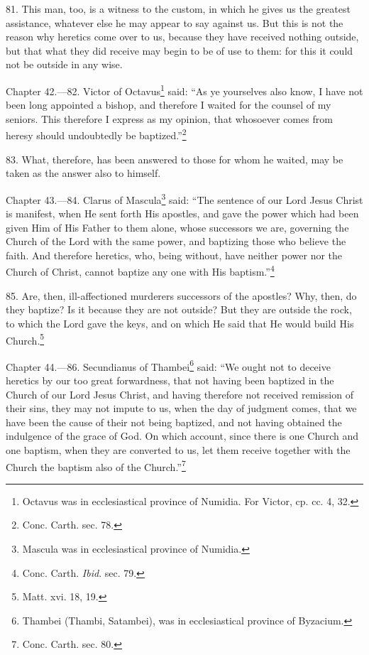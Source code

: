 81. This man, too, is a witness to the custom, in which he gives us the greatest assistance, whatever else he may appear to say against us. But this is not the reason why heretics come over to us, because they have received nothing outside, but that what they did receive may begin to be of use to them: for this it could not be outside in any wise.


Chapter 42.—82. Victor of Octavus\footnote{\par  Octavus was in ecclesiastical province of Numidia. For Victor, cp. cc. 4, 32.} said: ``As ye yourselves also know, I have not been long appointed a bishop, and therefore I waited for the counsel of my seniors. This therefore I express as my opinion, that whosoever comes from heresy should undoubtedly be baptized.''\footnote{\par  Conc. Carth. sec. 78.}

83. What, therefore, has been answered to those for whom he waited, may be taken as the answer also to himself.


Chapter 43.—84. Clarus of Mascula\footnote{\par  Mascula was in ecclesiastical province of Numidia.} said: ``The sentence of our Lord Jesus Christ is manifest, when He sent forth His apostles, and gave the power which had been given Him of His Father to them alone, whose successors we are, governing the Church of the Lord with the same power, and baptizing those who believe the faith. And therefore heretics, who, being without, have neither power nor the Church of Christ, cannot baptize any one with His baptism.''\footnote{\par  Conc. Carth. \emph{Ibid}. sec. 79.}

85. Are, then, ill-affectioned murderers successors of the apostles? Why, then, do they baptize? Is it because they are not outside? But they are outside the rock, to which the Lord gave the keys, and on which He said that He would build His Church.\footnote{\par  Matt. xvi. 18, 19.}


Chapter 44.—86. Secundianus of Thambei\footnote{\par  Thambei (Thambi, Satambei), was in ecclesiastical province of Byzacium.} said: ``We ought not to deceive heretics by our too great forwardness, that not having been baptized in the Church of our Lord Jesus Christ, and having therefore not received remission of their sins, they may not impute to us, when the day of judgment comes, that we have been the cause of their not being baptized, and not having obtained the indulgence of the grace of God. On which account, since there is one Church and one baptism, when they are converted to us, let them receive together with the Church the baptism also of the Church.''\footnote{\par  Conc. Carth. sec. 80.}

